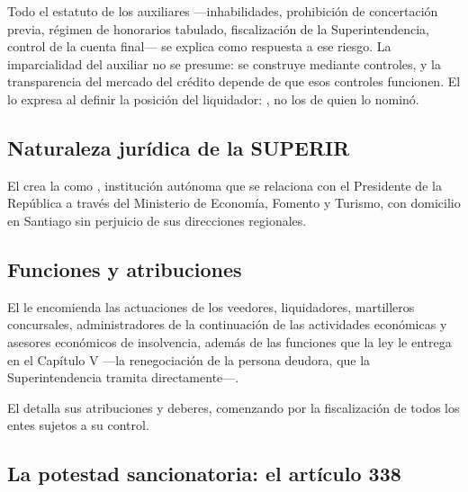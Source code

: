 Todo el estatuto de los auxiliares ---inhabilidades, prohibición de concertación previa,
régimen de honorarios tabulado, fiscalización de la Superintendencia, control de la cuenta
final--- se explica como respuesta a ese riesgo. La imparcialidad del auxiliar no se presume:
se construye mediante controles, y la transparencia del mercado del crédito depende de que
esos controles funcionen. El  lo expresa al definir la posición del liquidador:
, no los de quien lo nominó.

\bloqueNormativo

\subsection{Naturaleza jurídica de la SUPERIR}

El  \parencite{ley-20720} crea la \Superir{} como , institución autónoma que se
relaciona con el Presidente de la República a través del Ministerio de Economía, Fomento y
Turismo, con domicilio en Santiago sin perjuicio de sus direcciones regionales.

\subsection{Funciones y atribuciones}

El  le encomienda  las actuaciones de los
veedores, liquidadores, martilleros concursales, administradores de la continuación de las
actividades económicas y asesores económicos de insolvencia, además de las funciones que la
ley le entrega en el Capítulo V ---la renegociación de la persona deudora, que la
Superintendencia tramita directamente---.

El  detalla sus atribuciones y deberes, comenzando por la fiscalización de todos los
entes sujetos a su control.

\subsection{La potestad sancionatoria: el artículo 338}

